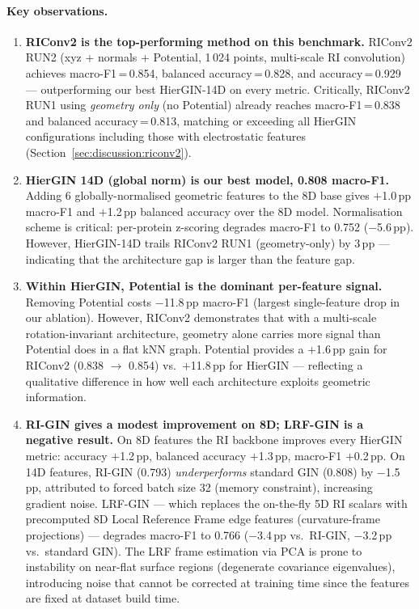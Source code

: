 \paragraph{Key observations.}
\begin{enumerate}

  \item \textbf{RIConv2 is the top-performing method on this benchmark.}
        RIConv2 RUN2 (xyz + normals + Potential, 1\,024 points, multi-scale RI
        convolution) achieves macro-F1\,=\,0.854, balanced accuracy\,=\,0.828,
        and accuracy\,=\,0.929 --- outperforming our best HierGIN-14D on every
        metric.
        Critically, RIConv2 RUN1 using \emph{geometry only} (no Potential)
        already reaches macro-F1\,=\,0.838 and balanced accuracy\,=\,0.813,
        matching or exceeding all HierGIN configurations including those with
        electrostatic features (Section~\ref{sec:discussion:riconv2}).

  \item \textbf{HierGIN 14D (global norm) is our best model, 0.808 macro-F1.}
        Adding 6 globally-normalised geometric features to the 8D base gives
        $+$1.0\,pp macro-F1 and $+$1.2\,pp balanced accuracy over the 8D
        model.
        Normalisation scheme is critical: per-protein z-scoring degrades
        macro-F1 to 0.752 ($-$5.6\,pp).
        However, HierGIN-14D trails RIConv2 RUN1 (geometry-only) by 3\,pp ---
        indicating that the architecture gap is larger than the feature gap.

  \item \textbf{Within HierGIN, Potential is the dominant per-feature signal.}
        Removing Potential costs $-$11.8\,pp macro-F1 (largest single-feature
        drop in our ablation).
        However, RIConv2 demonstrates that with a multi-scale rotation-invariant
        architecture, geometry alone carries more signal than Potential does in
        a flat kNN graph.
        Potential provides a $+$1.6\,pp gain for RIConv2 (0.838 $\to$ 0.854)
        vs.\ $+$11.8\,pp for HierGIN --- reflecting a qualitative difference
        in how well each architecture exploits geometric information.

  \item \textbf{RI-GIN gives a modest improvement on 8D; LRF-GIN is a negative result.}
        On 8D features the RI backbone improves every HierGIN metric:
        accuracy $+$1.2\,pp, balanced accuracy $+$1.3\,pp, macro-F1 $+$0.2\,pp.
        On 14D features, RI-GIN (0.793) \emph{underperforms} standard GIN (0.808) by $-$1.5\,pp,
        attributed to forced batch size 32 (memory constraint), increasing gradient noise.
        LRF-GIN --- which replaces the on-the-fly 5D RI scalars with precomputed
        8D Local Reference Frame edge features (curvature-frame projections) ---
        degrades macro-F1 to 0.766 ($-$3.4\,pp vs.\ RI-GIN, $-$3.2\,pp vs.\ standard GIN).
        The LRF frame estimation via PCA is prone to instability on near-flat surface
        regions (degenerate covariance eigenvalues), introducing noise that cannot be
        corrected at training time since the features are fixed at dataset build time.


\end{enumerate}
